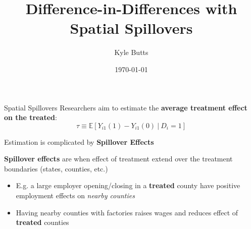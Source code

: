\documentclass[aspectratio=169]{beamer}
\title{Difference-in-Differences with Spatial Spillovers}
\date{\today}
\author{Kyle Butts}
\begin{document}
\maketitle

\begin{frame}{Spatial Spillovers}
    Researchers aim to estimate the \textbf{average treatment effect on the treated}: 
    \[
        \tau \equiv \mathbb{E} \left[ Y_{i1}(1) - Y_{i1}(0) \ \vert \ D_{i} = 1 \right]
    \]
    
    Estimation is complicated by \textbf{Spillover Effects}
    
    \vspace{5mm}
    \textbf{Spillover effects} are when effect of treatment extend over the treatment boundaries (states, counties, etc.)
    
    \begin{itemize}
        \item E.g. a large employer opening/closing in a \textbf{treated} county have positive employment effects on \textit{nearby counties}
        
        \item Having nearby counties with factories raises wages and reduces effect of \textbf{treated} counties
    \end{itemize}
\end{frame}
\end{document}
